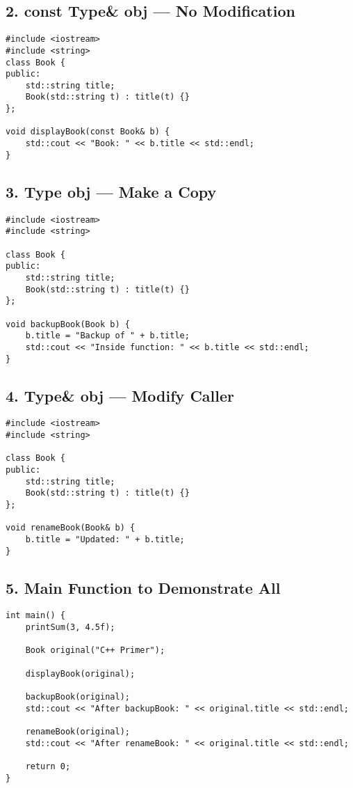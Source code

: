 \documentclass[12pt]{article}
\begin{document}
\subsection*{2. const Type\& obj — No Modification}
\begin{verbatim}
#include <iostream>
#include <string>
class Book {
public:
    std::string title;
    Book(std::string t) : title(t) {}
};

void displayBook(const Book& b) {
    std::cout << "Book: " << b.title << std::endl;
}
\end{verbatim}

\subsection*{3. Type obj — Make a Copy}
\begin{verbatim}
#include <iostream>
#include <string>

class Book {
public:
    std::string title;
    Book(std::string t) : title(t) {}
};

void backupBook(Book b) {
    b.title = "Backup of " + b.title;
    std::cout << "Inside function: " << b.title << std::endl;
}
\end{verbatim}
\newpage
\subsection*{4. Type\& obj — Modify Caller}
\begin{verbatim}
#include <iostream>
#include <string>

class Book {
public:
    std::string title;
    Book(std::string t) : title(t) {}
};

void renameBook(Book& b) {
    b.title = "Updated: " + b.title;
}
\end{verbatim}

\subsection*{5. Main Function to Demonstrate All}
\begin{verbatim}
int main() {
    printSum(3, 4.5f);

    Book original("C++ Primer");

    displayBook(original);

    backupBook(original);
    std::cout << "After backupBook: " << original.title << std::endl;

    renameBook(original);
    std::cout << "After renameBook: " << original.title << std::endl;

    return 0;
}
\end{verbatim}
\end{document}

